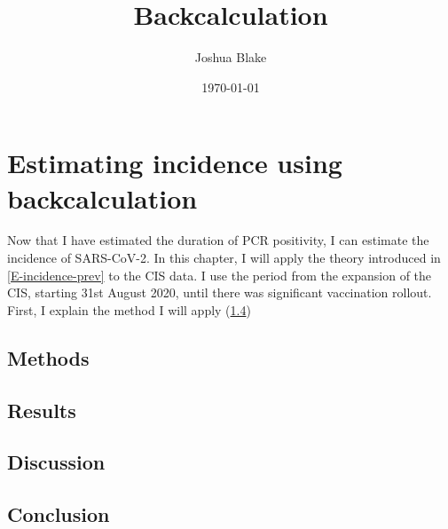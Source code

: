 \documentclass[thesis.tex]{subfiles}
\title{Backcalculation}
\author{Joshua Blake}
\date{\today}
\begin{document}
\ifSubfilesClassLoaded{
  \setcounter{chapter}{6}
}

\chapter{Estimating incidence using backcalculation} \label{backcalc}

Now that I have estimated the duration of PCR positivity, I can estimate the incidence of SARS-CoV-2.
In this chapter, I will apply the theory introduced in \cref{E-incidence-prev} to the CIS data.
I use the period from the expansion of the CIS, starting 31st August 2020, until there was significant vaccination rollout.
First, I explain the method I will apply (\cref{})

\section{Methods}

\section{Results}

\section{Discussion}

\section{Conclusion}


\ifSubfilesClassLoaded{
  \listoftodos
}{}
\end{document}
